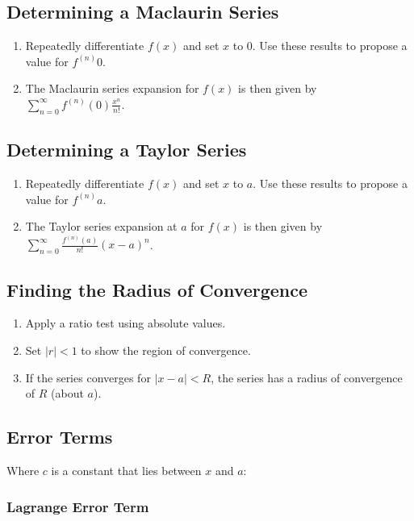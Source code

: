 \documentclass[10pt,twoside,twocolumn]{article}
\begin{document}
\subsection{Determining a Maclaurin Series}
\begin{enumerate}
\item Repeatedly differentiate $f\left(x\right)$ and set $x$ to 0. Use
these results to propose a value for $f^{\left(n\right)}0$. 
\item The Maclaurin series expansion for $f\left(x\right)$ is then given
by $\sum_{n=0}^{\infty}f^{\left(n\right)}\left(0\right)\frac{x^{n}}{n!}$. 
\end{enumerate}

\subsection{Determining a Taylor Series}
\begin{enumerate}
\item Repeatedly differentiate $f\left(x\right)$ and set $x$ to $a$.
Use these results to propose a value for $f^{\left(n\right)}a$. 
\item The Taylor series expansion at $a$ for $f\left(x\right)$ is then
given by $\sum_{n=0}^{\infty}\frac{f^{\left(n\right)}\left(a\right)}{n!}\left(x-a\right)^{n}$. 
\end{enumerate}

\subsection{Finding the Radius of Convergence}
\begin{enumerate}
\item Apply a ratio test using absolute values. 
\item Set $\left|r\right|<1$ to show the region of convergence. 
\item If the series converges for $\left|x-a\right|<R$, the series has
a radius of convergence of $R$ (about $a$). 
\end{enumerate}

\subsection{Error Terms}

Where $c$ is a constant that lies between $x$ and $a$:


\subsubsection{Lagrange Error Term}
\end{document}
